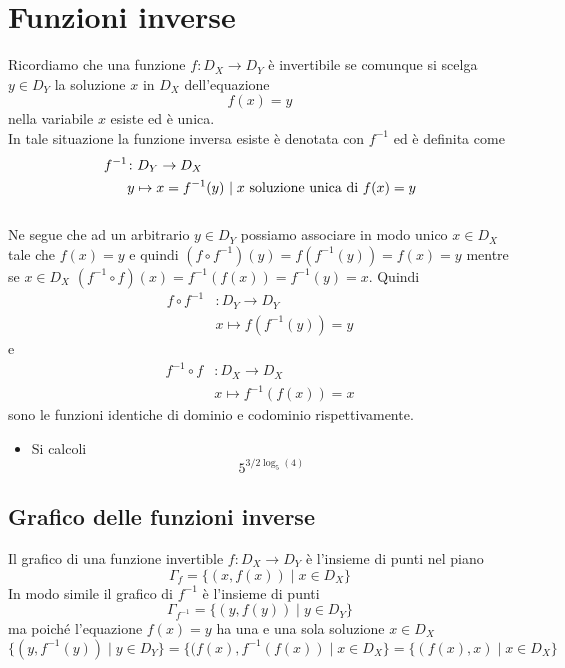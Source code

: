 \documentclass[onecolumn,11pt]{book}
\begin{document}
\section{Funzioni inverse}
Ricordiamo che una funzione $f\colon D_X\rightarrow D_Y$
\`e invertibile se comunque si scelga $y\in D_Y$ la soluzione $x$ in $D_X$ dell'equazione
\[f(x)=y \]
nella variabile $x$ esiste ed \`e unica. 
\\
In tale situazione la funzione inversa esiste \`e denotata con $f^{-1}$ ed  \`e definita come
\begin{align*}     f^{-1}&\colon D_Y\rightarrow D_X
\\
&y\mapsto x=f^{-1}(y) \hbox{ $\mid x$ soluzione unica di } f(x)=y\end{align*}
\\
Ne segue che ad un arbitrario $y\in D_Y$  possiamo associare in modo unico $x\in D_X$ tale che $f(x)=y$  e quindi
$(f\circ f^{-1})(y)=f(f^{-1}(y))=f(x)=y$  mentre se $x \in D_X$ $(f^{-1}\circ f)(x)= f^{-1}(f(x))=f^{-1}(y)=x$.  Quindi
\begin{align}  f\circ f^{-1}&\colon D_Y\rightarrow D_Y
\\
&x\mapsto f(f^{-1}(y))=y\end{align}
 e
\begin{align*} f^{-1} \circ f&\colon D_X\rightarrow D_X
\\
&x\mapsto f^{-1}(f(x))=x\end{align*}
sono le funzioni identiche di dominio e codominio rispettivamente.
\begin{itemize}
\item Si calcoli 
\[5^{3/2 \log_{5}(4)}\]
\end{itemize}
\subsection{Grafico delle funzioni inverse}
Il grafico di una funzione invertible 
$f\colon D_X\rightarrow D_Y$ \`e
l'insieme di punti nel piano 
\[\Gamma_f=\{(x,f(x))\mid x \in D_X\}\]
In modo simile il grafico di $f^{-1}$ \`e l'insieme di punti
\[\Gamma_{f^{-1}}=\{(y,f(y))\mid y \in D_Y\}\]
ma poich\'e l'equazione $f(x)=y$ ha una e una sola soluzione $x\in D_X$
\[\{(y,f^{-1}(y))\mid y \in D_Y\}=\{(f(x),f^{-1}(f(x))\mid x \in D_X\}=\{(f(x),x)\mid x \in D_X\}\]
\end{document}
